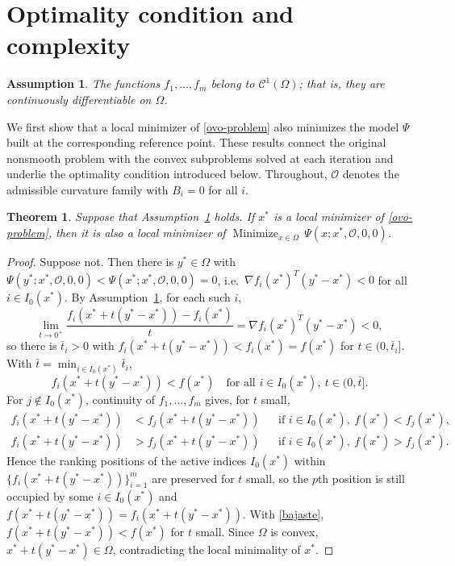 \documentclass[11pt]{article}
\newcommand{\minimize}{\mathop{\text{Minimize}}}
\newtheorem{theorem}{Theorem}[section]
\newtheorem{assumption}{Assumption}
\begin{document}
\section{Optimality condition and complexity} \label{sec:complexity}

\begin{assumption} \label{a1}
The functions $f_1, \ldots, f_m$ belong to $\mathcal{C}^1(\Omega)$; that is,
they are continuously differentiable on $\Omega$.
\end{assumption}

We first show that a local minimizer of \eqref{ovo-problem} also minimizes the
model $\Psi$ built at the corresponding reference point. These results connect
the original nonsmooth problem with the convex subproblems solved at each
iteration and underlie the optimality condition introduced below. Throughout,
$\mathcal{O}$ denotes the admissible curvature family with $B_i = 0$ for all
$i$.

\begin{theorem} \label{teo:conv1}
Suppose that Assumption~\ref{a1} holds. If $x^*$ is a local minimizer of
\eqref{ovo-problem}, then it is also a local minimizer of
$\minimize_{x \in \Omega}\, \Psi(x; x^*, \mathcal{O}, 0, 0)$.
\end{theorem}

\begin{proof}
Suppose not. Then there is $y^* \in \Omega$ with
$\Psi(y^*; x^*, \mathcal{O}, 0, 0) < \Psi(x^*; x^*, \mathcal{O}, 0, 0) = 0$, i.e.\
$\nabla f_i(x^*)^T(y^* - x^*) < 0$ for all $i \in I_0(x^*)$. By
Assumption~\ref{a1}, for each such $i$,
\[
\lim_{t \to 0^+} \frac{f_i(x^* + t(y^* - x^*)) - f_i(x^*)}{t}
= \nabla f_i(x^*)^T(y^* - x^*) < 0,
\]
so there is $\bar{t}_i > 0$ with $f_i(x^* + t(y^* - x^*)) < f_i(x^*) = f(x^*)$
for $t \in (0, \bar{t}_i]$. With $\bar{t} = \min_{i \in I_0(x^*)} \bar{t}_i$,
\begin{equation} \label{bajaste}
f_i(x^* + t(y^* - x^*)) < f(x^*) \quad
\text{for all } i \in I_0(x^*),\ t \in (0, \bar{t}].
\end{equation}
For $j \notin I_0(x^*)$, continuity of $f_1, \ldots, f_m$ gives, for $t$ small,
\begin{align}
f_i(x^* + t(y^* - x^*)) &< f_j(x^* + t(y^* - x^*))
&&\text{if } i \in I_0(x^*),\ f(x^*) < f_j(x^*), \label{arriba}\\
f_i(x^* + t(y^* - x^*)) &> f_j(x^* + t(y^* - x^*))
&&\text{if } i \in I_0(x^*),\ f(x^*) > f_j(x^*). \label{abajo}
\end{align}
Hence the ranking positions of the active indices $I_0(x^*)$ within
$\{f_i(x^* + t(y^* - x^*))\}_{i=1}^m$ are preserved for $t$ small, so the $p$th
position is still occupied by some $i \in I_0(x^*)$ and
$f(x^* + t(y^* - x^*)) = f_i(x^* + t(y^* - x^*))$. With \eqref{bajaste},
$f(x^* + t(y^* - x^*)) < f(x^*)$ for $t$ small. Since $\Omega$ is convex,
$x^* + t(y^* - x^*) \in \Omega$, contradicting the local minimality of $x^*$.
\end{proof}
\end{document}
